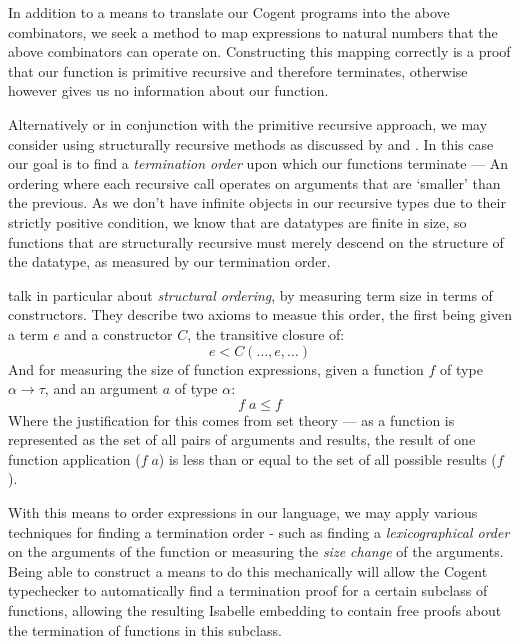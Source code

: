 In addition to a means to translate our Cogent programs into the above combinators,
we seek a method to map expressions to natural numbers that the above combinators can
operate on. Constructing this mapping correctly is a proof that our function is primitive recursive and
therefore terminates, otherwise however gives us no information about our function.

Alternatively or in conjunction with the primitive recursive approach, we may consider using
structurally recursive methods as discussed by \citet{StrucrecStructures} and \citet{PredicateStructrec}.
In this case our goal is to find a \textit{termination order} upon which our functions terminate --- An ordering
where each recursive call operates on arguments that are `smaller' than the previous. 
As we don't have infinite objects in our recursive types due to their strictly positive condition, 
we know that are datatypes are finite in size, so functions that are  structurally recursive must
merely descend on the structure of the datatype, as measured by our termination order.

\citet{PredicateStructrec} talk in particular about \textit{structural ordering}, by measuring term size in
terms of constructors. They describe two axioms to measue this order, the first being given
a term $e$ and a constructor $C$, the transitive closure of:
$$
    e < C (\dots, e, \dots)
$$
And for measuring the size of function expressions, given a function $f$ of type $\alpha \longrightarrow \tau$,
and an argument $a$ of type $\alpha$:
$$
    f\; a \leq f
$$
Where the justification for this comes from set theory --- as a function is represented as the set of all pairs of
arguments and results, the result of one function application ($f\; a$) is less than or equal to the set of
all possible results ($f$).

With this means to order expressions in our language, we may apply various techniques for finding a termination
order - such as finding a \textit{lexicographical order} on the arguments of the function or measuring the \textit{size change}
of the arguments. Being able to construct a means to do this mechanically will allow the Cogent typechecker to automatically
find a termination proof for a certain subclass of functions, allowing the resulting Isabelle embedding to contain free
proofs about the termination of functions in this subclass. 